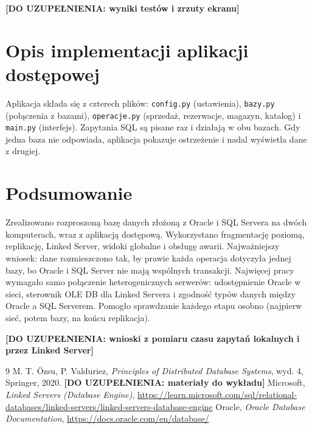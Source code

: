 \documentclass[11pt,a4paper]{article}
\newcommand{\douzup}[1]{\textcolor{red!75!black}{\textbf{[DO UZUPEŁNIENIA: #1]}}}
\begin{document}
\douzup{wyniki testów i zrzuty ekranu}

\section{Opis implementacji aplikacji dostępowej}
Aplikacja składa się z czterech plików: \texttt{config.py} (ustawienia),
\texttt{bazy.py} (połączenia z bazami), \texttt{operacje.py} (sprzedaż, rezerwacje,
magazyn, katalog) i \texttt{main.py} (interfejs). Zapytania SQL są pisane raz
i działają w obu bazach. Gdy jedna baza nie odpowiada, aplikacja pokazuje
ostrzeżenie i nadal wyświetla dane z drugiej.

\section{Podsumowanie}
Zrealizowano rozproszoną bazę danych złożoną z Oracle i SQL Servera na dwóch
komputerach, wraz z aplikacją dostępową. Wykorzystano fragmentację poziomą,
replikację, Linked Server, widoki globalne i obsługę awarii. Najważniejszy wniosek:
dane rozmieszczono tak, by prawie każda operacja dotyczyła jednej bazy, bo Oracle
i SQL Server nie mają wspólnych transakcji. Najwięcej pracy wymagało samo połączenie
heterogenicznych serwerów: udostępnienie Oracle w sieci, sterownik OLE DB dla Linked
Servera i zgodność typów danych między Oracle a SQL Serverem. Pomogło sprawdzanie
każdego etapu osobno (najpierw sieć, potem bazy, na końcu replikacja).

\douzup{wnioski z pomiaru czasu zapytań lokalnych i przez Linked Server}

\begin{thebibliography}{9}\small
{} M. T. Özsu, P. Valduriez, \emph{Principles of Distributed Database Systems}, wyd. 4, Springer, 2020.
 \douzup{materiały do wykładu}
 Microsoft, \emph{Linked Servers (Database Engine)},
  \url{https://learn.microsoft.com/sql/relational-databases/linked-servers/linked-servers-database-engine}
 Oracle, \emph{Oracle Database Documentation}, \url{https://docs.oracle.com/en/database/}
\end{thebibliography}
\end{document}
